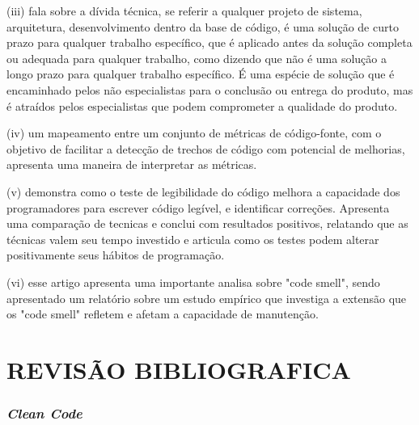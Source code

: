 \documentclass[12pt]{article}
\begin{document}
 (iii) \cite{TR_QC_TECHNICAL_DEBT} fala sobre a dívida técnica, se referir a qualquer projeto de sistema, arquitetura, desenvolvimento dentro da base de código, é uma solução de curto prazo para qualquer trabalho específico, que é aplicado antes da solução completa ou adequada para
qualquer trabalho, como dizendo que não é uma solução a longo prazo para qualquer trabalho específico. É uma espécie de solução que é encaminhado pelos não especialistas para o conclusão ou entrega do produto, mas é atraídos pelos especialistas que podem comprometer a qualidade do produto.

 (iv) \cite{TR_CLEAN_CODE_METRICA} um mapeamento entre um conjunto de métricas de código-fonte, com o objetivo de facilitar a detecção de trechos de código com potencial de melhorias, apresenta uma maneira de interpretar as métricas.

 (v) \cite{CODE_READABILITY_TESTING_STUDY} demonstra
como o teste de legibilidade do código melhora a capacidade dos programadores
para escrever código legível, e identificar correções. Apresenta uma comparação de tecnicas e conclui com resultados positivos, relatando que as técnicas valem seu tempo investido e articula como os testes podem alterar positivamente seus hábitos de programação.
 
 (vi) \cite{CODE_SMELLS_REFLECT_IMPORTANT_MAINTAINABILITY_ASPECTS} esse artigo apresenta uma importante analisa sobre "code smell", sendo apresentado um relatório sobre um estudo empírico que investiga a extensão que os "code smell" refletem e afetam a capacidade de manutenção.

\part{REVISÃO BIBLIOGRAFICA} \label{sec:revisaobibliografica}

\section{\textit{Clean Code}} \label{sec:cleancode}
\end{document}

